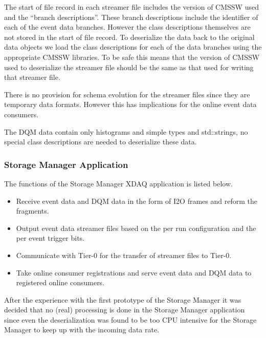 The start of file record in each streamer file includes the version of CMSSW used
and the ``branch descriptions''. These branch descriptions
 include the identifier of each of the event
data branches. However the class descriptions themselves are not stored in
the start of file record. To deserialize the data back to the original data objects
we load the class descriptions for each of the data branches using the 
appropriate CMSSW libraries. To be safe this means that the version of CMSSW
used to deserialize the streamer file should be the same as that used for
writing that streamer file. 

There is no provision for schema evolution for the
streamer files since they are temporary data formats. However this has implications
for the online event data consumers.

The DQM data contain
only histograms and simple types and std::strings, no special class descriptions
are needed to deserialize these data.


\subsubsection{Storage Manager Application}

The functions of the Storage Manager XDAQ application is listed below.

\begin{itemize}
\item Receive event data and DQM data in the form of I2O frames and
reform the fragments.
\item Output event data streamer files based on the per run configuration 
and the per event trigger bits.
\item Communicate with Tier-0 for the transfer of streamer files to Tier-0.
\item Take online consumer registrations and serve event data and DQM
data to registered online consumers.
\end{itemize}

After the experience with the first prototype of the Storage Manager it was
decided that no (real) processing is done in the Storage Manager application
since even the deserialization was found to be too CPU intensive for the
Storage Manager to keep up with the incoming data rate.

